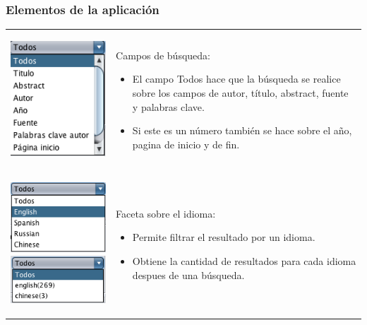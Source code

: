 \documentclass{beamer} %
\begin{document}
\begin{frame}
	\frametitle{Elementos de la aplicación}
	\begin{tabular}{cl}
		\begin{minipage}{0.33\textwidth}	
			\begin{center}
					\includegraphics[scale=0.35]{Img/Img5.png}
			\end{center}
		\end{minipage}
 	 & 
		\begin{minipage}[t]{0.65\textwidth}
		Campos de búsqueda:
    	\begin{itemize}
    		\item El campo Todos hace que la búsqueda se realice sobre los campos de autor, título, abstract, fuente y palabras clave.
    		\item Si este es un número también se hace sobre el año, pagina de inicio y de fin.
    	\end{itemize}
 	 \end{minipage}\\
		\begin{minipage}{0.33\textwidth}	
			\begin{center}
					\includegraphics[scale=0.35]{Img/Img6.png}
					\includegraphics[scale=0.35]{Img/Img7.png}
			\end{center}		
		\end{minipage}  
	& 
	\begin{minipage}[t]{0.65\textwidth}
	Faceta sobre el idioma:
    	\begin{itemize}
    		\item Permite filtrar el resultado por un idioma.
    		\item Obtiene la cantidad de resultados para cada idioma despues de una búsqueda.
    	\end{itemize}
 	 \end{minipage}\\
	\end{tabular} 
\end{frame}	  
\end{document}
